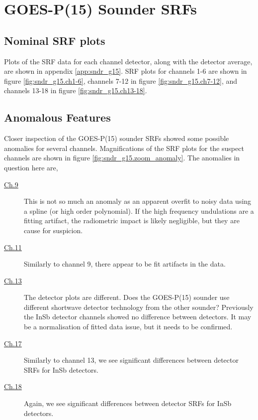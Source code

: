\section{GOES-P(15) Sounder SRFs}

\subsection{Nominal SRF plots}
Plots of the SRF data for each channel detector, along with the detector average, are shown in appendix \ref{app:sndr_g15}. SRF plots for channels 1-6 are shown in figure \ref{fig:sndr_g15.ch1-6}, channels 7-12 in figure \ref{fig:sndr_g15.ch7-12}, and channels 13-18 in figure \ref{fig:sndr_g15.ch13-18}.

\subsection{Anomalous Features}
Closer inspection of the GOES-P(15) sounder SRFs showed some possible anomalies for several channels. Magnifications of the SRF plots for the suspect channels are shown in figure \ref{fig:sndr_g15.zoom_anomaly}. The anomalies in question here are,
\begin{description}
  \item[{\hyperref[fig:sndr_g15.zoom_anomaly]{Ch.9}}] This is not so much an anomaly as an apparent overfit to noisy data using a spline (or high order polynomial). If the high frequency undulations are a fitting artifact, the radiometric impact is likely negligible, but they are cause for suspicion.
  \item[{\hyperref[fig:sndr_g15.zoom_anomaly]{Ch.11}}] Similarly to channel 9, there appear to be fit artifacts in the data.
  \item[{\hyperref[fig:sndr_g15.zoom_anomaly]{Ch.13}}] The detector plots are different. Does the GOES-P(15) sounder use different shortwave detector technology from the other sounder? Previously the InSb detector channels showed no difference between detectors. It may be a normalisation of fitted data issue, but it needs to be confirmed.
  \item[{\hyperref[fig:sndr_g15.zoom_anomaly]{Ch.17}}] Similarly to channel 13, we see significant differences between detector SRFs for InSb detectors.
  \item[{\hyperref[fig:sndr_g15.zoom_anomaly]{Ch.18}}] Again, we see significant differences between detector SRFs for InSb detectors.
\end{description}


